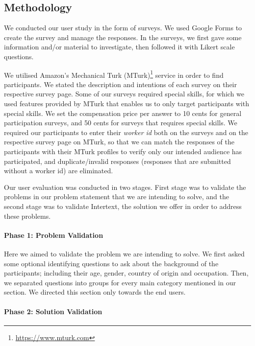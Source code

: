 \subsection{Methodology}

We conducted our user study in the form of surveys. We used Google Forms to create the survey and manage the responses. In the surveys, we first gave some information and/or material to investigate, then followed it with Likert scale questions.

We utilised Amazon's Mechanical Turk (MTurk)\footnote{\url{https://www.mturk.com}} service in order to find participants. We stated the description and intentions of each survey on their respective survey page. Some of our surveys required special skills, for which we used features provided by MTurk that enables us to only target participants with special skills. We set the compensation price per answer to 10 cents for general participation surveys, and 50 cents for surveys that requires special skills. We required our participants to enter their \textit{worker id} both on the surveys and on the respective survey page on MTurk, so that we can match the responses of the participants with their MTurk profiles to verify only our intended audience has participated, and duplicate/invalid responses (responses that are submitted without a worker id) are eliminated.

Our user evaluation was conducted in two stages. First stage was to validate the problems in our problem statement that we are intending to solve, and the second stage was to validate Intertext, the solution we offer in order to address these problems. 

\paragraph{Phase 1: Problem Validation}

Here we aimed to validate the problem we are intending to solve. We first asked some optional identifying questions to ask about the background of the participants; including their age, gender, country of origin and occupation. Then, we separated questions into groups for every main category mentioned in our  section. We directed this section only towards the end users.

\paragraph{Phase 2: Solution Validation}

